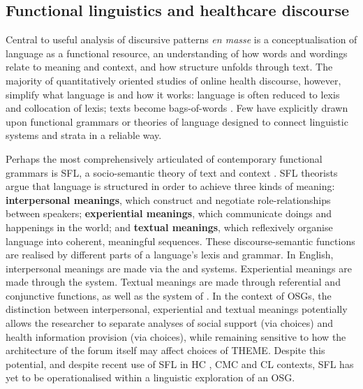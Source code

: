 \subsection{Functional linguistics and healthcare discourse}

Central to useful analysis of discursive patterns \emph{en masse} is a conceptualisation of language as a functional resource, an understanding of how words and wordings relate to meaning and context, and how structure unfolds through text. The majority of quantitatively oriented studies of online health discourse, however, simplify what language is and how it works: language is often reduced to lexis and collocation of lexis; texts become bags\hyp{}of\hyp{}words \cite[e.g.][]{maclean_forum77:_2015,yesha_method_2015}. Few have explicitly drawn upon functional grammars or theories of language designed to connect linguistic systems and strata in a reliable way.

Perhaps the most comprehensively articulated of contemporary functional grammars \cite{eggins_analysing_2004} is \gls{SFL}, a socio\hyp{}semantic theory of text and context \cite{halliday_introduction:_2004}. \gls{SFL} theorists argue that language is structured in order to achieve three kinds of meaning: \textbf{interpersonal meanings}, which construct and negotiate role\hyp{}relationships between speakers; \textbf{experiential meanings}, which communicate doings and happenings in the world; and \textbf{textual meanings}, which reflexively organise language into coherent, meaningful sequences. These \gls{discourse-semantic} functions are realised by different parts of a language's lexis and grammar. In English, interpersonal meanings are made via the  and  systems. Experiential meanings are made through the  system. Textual meanings are made through referential and conjunctive functions, as well as the system of . In the context of \glspl{OSG}, the distinction between interpersonal, experiential and textual meanings potentially allows the researcher to separate analyses of social support (via  choices) and health information provision (via  choices), while remaining sensitive to how the architecture of the \gls{forum} itself may affect choices of \gls{THEME}. Despite this potential, and despite recent use of \gls{SFL} in \gls{HC} \cite{matthiessen_applying_2013,slade_communicating_2015,woodward-kron_international_2016}, \gls{CMC} \cite{lander_building_2014,zappavigna_enacting_2013} and \gls{CL} \cite{hunston_systemic_2013,thompson_system_2014} contexts, \gls{SFL} has yet to be operationalised within a linguistic exploration of an \gls{OSG}.

